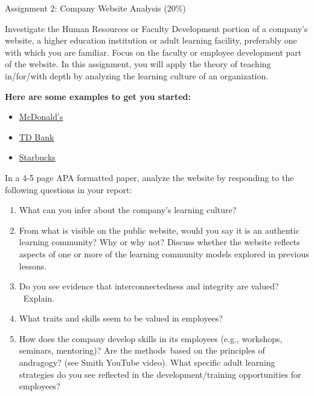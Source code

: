 \documentclass[
]{book}
\providecommand{\tightlist}{%
  \setlength{\itemsep}{0pt}\setlength{\parskip}{0pt}}
\begin{document}
\begin{assessment}
{Assignment 2: Company Website Analysis (20\%)}

Investigate the Human Resources or Faculty Development portion of a company's website, a higher education institution or adult learning facility, preferably one with which you are familiar. Focus on the faculty or employee development part of the website. In this assignment, you will apply the theory of teaching in/for/with depth by analyzing the learning culture of an organization.

\textbf{Here are some examples to get you started:}

\begin{itemize}
\tightlist
\item
  \href{https://www.mcdonalds.com/ca/en-ca/careers/training-and-benefits.html}{McDonald's}\\
\item
  \href{https://jobs.td.com/en-CA/why-choose-us/training-development/}{TD Bank}\\
\item
  \href{https://www.starbucks.com.hk/about-us/become-a-partner/learning-and-development}{Starbucks}
\end{itemize}

In a 4-5 page APA formatted paper, analyze the website by responding to the following questions in your report:

\begin{enumerate}
\def\labelenumi{\arabic{enumi}.}
\tightlist
\item
  What can you infer about the company's learning culture?\\
\item
  From what is visible on the public website, would you say it is an authentic learning community? Why or why not? Discuss whether the website reflects aspects of one or more of the learning community models explored in previous lessons.\\
\item
  Do you see evidence that interconnectedness and integrity are valued? ~Explain.\\
\item
  What traits and skills seem to be valued in employees?\\
\item
  How does the company develop skills in its employees (e.g., workshops, seminars, mentoring)? Are the methods~based on the principles of andragogy? (see Smith YouTube video). What specific adult learning strategies do you see reflected in the development/training opportunities for employees?
\end{enumerate}


\end{assessment}
\end{document}

